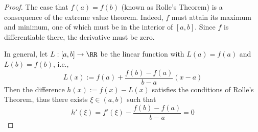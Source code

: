 

\begin{proof}
The case that $f(a)=f(b)$ (known as Rolle's Theorem) 
is a consequence of the extreme value theorem. Indeed, $f$ must attain 
its maximum and minimum, one of which must be in the interior of $[a,b]$. 
Since $f$ is differentiable there, the derivative must be zero.

In general, let $L:[a,b]\to\RR$ be the linear function 
with $L(a)=f(a)$ and $L(b)=f(b)$, i.e.,
$$
L(x):=f(a) + \frac{f(b)-f(a)}{b-a}(x-a)
$$
Then the difference $h(x):=f(x)-L(x)$ satisfies the conditions 
of Rolle's Theorem, thus there exists $\xi\in (a,b)$ such 
that 
$$
h'(\xi) = f'(\xi)-\frac{f(b)-f(a)}{b-a} = 0
$$

\end{proof}

